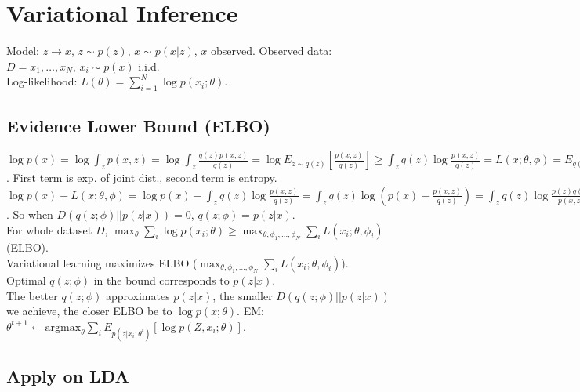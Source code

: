 \section{Variational Inference}

Model: $z \rightarrow x$, $z \sim p(z)$, $x \sim p(x|z)$, $x$ observed.
Observed data: $D = {x_1, \dots, x_N}$, $x_i \sim p(x)$ i.i.d.\\
Log-likelihood: $L(\theta) = \sum_{i=1}^N \log p(x_i; \theta)$.\\

\subsection*{Evidence Lower Bound (ELBO)}

$\log p(x) = \log \int_z p(x, z) = \log \int_z \frac{q(z)p(x, z)}{q(z)} = \log E_{z \sim q(z)}\left[\frac{p(x, z)}{q(z)}\right] \geq \int_z q(z) \log \frac{p(x, z)}{q(z)} = L(x; \theta, \phi) = E_{q(z)}[\log p(x, z)] + H(q(z))$. First term is exp. of joint dist., second term is entropy.\\
$\log p(x) - L(x; \theta, \phi) = \log p(x) - \int_z q(z) \log \frac{p(x, z)}{q(z)} = \int_z q(z)\log(p(x) - \frac{p(x, z)}{q(z)}) = \int_z q(z) \log \frac{p(z)q(z)}{p(x, z)} = D(q(z)||p(z|x))$. So when $D(q(z; \phi)||p(z | x)) = 0$, $q(z; \phi) = p(z | x)$.\\
For whole dataset $D$, $\max_\theta \sum_i \log p(x_i; \theta) \geq \max_{\theta, \phi_1, \dots, \phi_N} \sum_i L(x_i; \theta, \phi_i)$ (ELBO).\\
Variational learning maximizes ELBO ($\max_{\theta, \phi_1, \dots, \phi_N} \sum_i L(x_i; \theta, \phi_i)$).\\
Optimal $q(z; \phi)$ in the bound corresponds to $p(z|x)$.\\
The better $q(z; \phi)$ approximates $p(z|x)$, the smaller $D(q(z;\phi)||p(z|x))$ we achieve, the closer ELBO be to $\log p(x;\theta)$.
EM: $\theta^{t+1} \leftarrow \text{argmax}_\theta \sum_i E_{p(z|x_i;\theta^t)}[\log p(Z, x_i; \theta)]$.\\

\subsection*{Apply on LDA}

